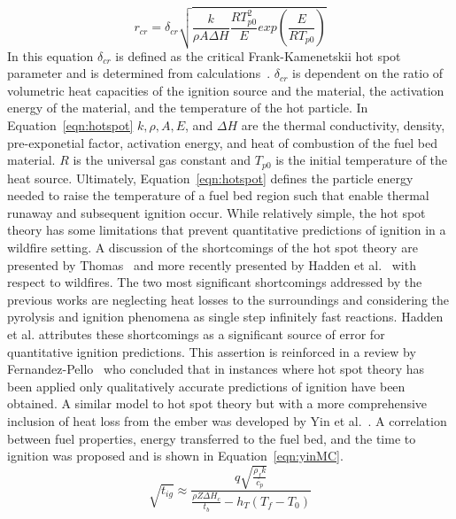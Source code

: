         \begin{equation}
            r_{cr} = \delta_{cr}\sqrt{\frac{k}{\rho A \Delta H}\frac{RT^{2}_{p0}}{E} exp\left(\frac{E}{RT_{p0}}  \right)}
            \label{eqn:hotspot}
        \end{equation}
    In this equation $\delta_{cr}$ is defined as the critical Frank-Kamenetskii hot spot parameter and is determined from calculations~\cite{Goldshleger1973IgnitionDimensions}. $\delta_{cr}$ is dependent on the ratio of volumetric heat capacities of the ignition source and the material, the activation energy of the material, and the temperature of the hot particle. In Equation~\ref{eqn:hotspot} $k, \rho, A, E$, and $\Delta H$ are the thermal conductivity, density, pre-exponetial factor, activation energy, and heat of combustion of the fuel bed material. $R$ is the universal gas constant and $T_{p0}$ is the initial temperature of the heat source.  Ultimately, Equation~\ref{eqn:hotspot} defines the particle energy needed to raise the temperature of a fuel bed region such that enable thermal runaway and subsequent ignition occur. While relatively simple, the hot spot theory has some limitations that prevent quantitative predictions of ignition in a wildfire setting. A discussion of the shortcomings of the hot spot theory are presented by Thomas~\cite{Thomas1965} and more recently presented by Hadden et al.~\cite{Hadden2011} with respect to wildfires. The two most significant shortcomings addressed by the previous works are neglecting heat losses to the surroundings and considering the pyrolysis and ignition phenomena as single step infinitely fast reactions. Hadden et al. attributes these shortcomings as a significant source of error for quantitative ignition predictions. This assertion is reinforced in a review by Fernandez-Pello~\cite{Fernandez-Pello2017} who concluded that in instances where hot spot theory has been applied only qualitatively accurate predictions of ignition have been obtained. A similar model to hot spot theory but with a more comprehensive inclusion of heat loss from the ember was developed by Yin et al.~\cite{Yin2014}. A correlation between fuel properties, energy transferred to the fuel bed, and the time to ignition was proposed and is shown in Equation~\ref{eqn:yinMC}.
        \begin{equation}
            \sqrt{t_{ig}} \approx \frac{q\sqrt{\frac{\rho_{f}k}{c_{p}}}}{\frac{\rho Z \Delta H_c}{t_b}- h_T(T_f - T_0)}
            \label{eqn:yinMC}
        \end{equation}

